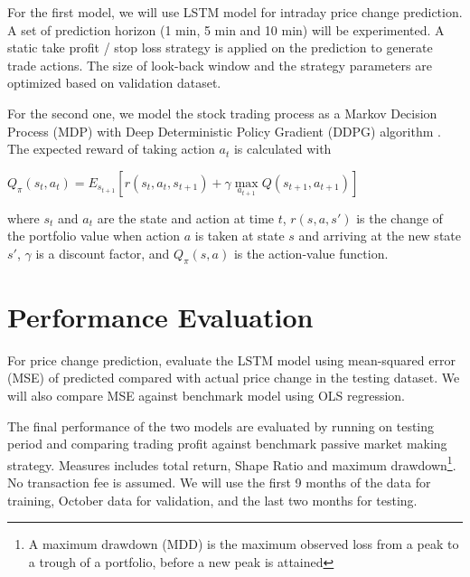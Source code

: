 \documentclass{article}
\begin{document}
For the first model, we will use LSTM model for intraday price change prediction. A set of prediction horizon (1 min, 5 min and 10 min) will be experimented. A static take profit / stop loss strategy is applied on the prediction to generate trade actions. The size of look-back window and the strategy parameters are optimized based on validation dataset. 

For the second one, we model the stock trading process as a Markov Decision Process (MDP) with Deep Deterministic Policy Gradient (DDPG) algorithm \cite{xiong2018practical}. The expected reward of taking action $a_t$ is calculated with

$Q_\pi(s_t,a_t)=E_{s_{t+1}}[r(s_t,a_t,s_{t+1})+\gamma \max\limits_{a_{t+1}} Q(s_{t+1},a_{t+1})]$

where $s_t$ and $a_t$ are the state and action at time $t$, $r(s,a,s')$ is the change of the portfolio value when action $a$ is taken at state $s$ and arriving at the new state $s'$, $\gamma$ is a discount factor, and $Q_\pi(s,a)$ is the action-value function.

\section{Performance Evaluation}

For price change prediction, evaluate the LSTM model using mean-squared error (MSE) of predicted compared with actual price change in the testing dataset. We will also compare MSE against benchmark model using OLS regression. 

The final performance of the two models are evaluated by running on testing period and comparing trading profit against benchmark passive market making strategy. Measures includes total return, Shape Ratio and maximum drawdown\footnote{A maximum drawdown (MDD) is the maximum observed loss from a peak to a trough of a portfolio, before a new peak is attained}. No transaction fee is assumed. We will use the first 9 months of the data for training, October data for validation, and the last two months for testing.

\pagebreak


\end{document}
